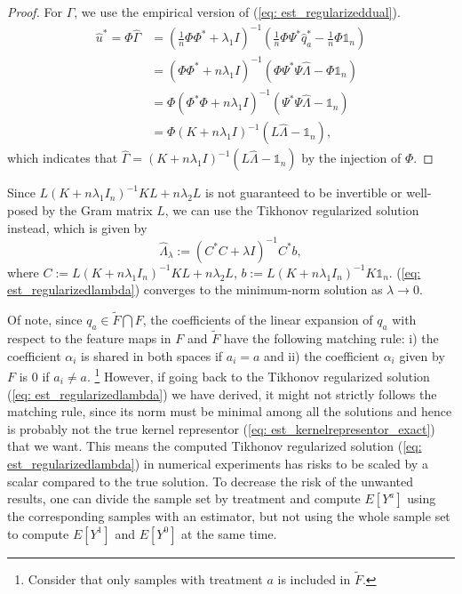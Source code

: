 \begin{proof}
    For $\widehat{\Gamma}$, we use the empirical version of (\ref{eq: est_regularizeddual}). 
    \begin{align*}
        \widehat{u}^* = \Phi\widehat{\Gamma} &= (\frac{1}{n}\Phi\Phi^*+\lambda_1I)^{-1}(\frac{1}{n}\Phi\Psi^*\widehat{q}_a^*-\frac{1}{n}\Phi\mathds{1}_n) \\
                                             &= (\Phi\Phi^*+n\lambda_1I)^{-1}(\Phi\Psi^*\Psi\widehat{\Lambda}-\Phi\mathds{1}_n) \\
                                             &= \Phi(\Phi^*\Phi+n\lambda_1I)^{-1}(\Psi^*\Psi\widehat{\Lambda}-\mathds{1}_n) \\
                                             &= \Phi(K+n\lambda_1I)^{-1}(L\widehat{\Lambda}-\mathds{1}_n),
    \end{align*}
    which indicates that $\widehat{\Gamma}=(K+n\lambda_1I)^{-1}(L\widehat{\Lambda}-\mathds{1}_n)$ by the injection of $\Phi$.
\end{proof}

Since $L(K+n\lambda_1I_n)^{-1}KL+n\lambda_2L$ is not guaranteed to be invertible or well-posed by the Gram matrix $L$, 
we can use the Tikhonov regularized solution instead, which is given by 
\begin{equation}
    \label{eq: est_regularizedlambda}
    \widehat{\Lambda}_{\lambda} := (C^*C+\lambda I)^{-1}C^*b,
\end{equation}
where $C:=L(K+n\lambda_1I_n)^{-1}KL+n\lambda_2L$, $b:=L(K+n\lambda_1I_n)^{-1}K\mathds{1}_n$. 
(\ref{eq: est_regularizedlambda}) converges to the minimum-norm solution as $\lambda\rightarrow 0$. 

\begin{remark}
    \label{rem: est_dilemmaofestimator}
    Of note, since $q_a\in\tilde{F}\bigcap F$, the coefficients of the linear expansion of $q_a$ with respect to the feature maps 
    in $F$ and $\tilde{F}$ have the following matching rule: i) the coefficient $\alpha_i$ is shared in both spaces if $a_i=a$ and 
    ii) the coefficient $\alpha_i$ given by $F$ is 0 if $a_i\neq a$. \footnote{Consider that only samples with treatment $a$ is included in $\tilde{F}$.}
    However, if going back to the Tikhonov regularized solution (\ref{eq: est_regularizedlambda}) we have derived, 
    it might not strictly follows the matching rule, 
    since its norm must be minimal among all the solutions and hence is probably not the true kernel representor (\ref{eq: est_kernelrepresentor_exact}) that we want.
    This means the computed Tikhonov regularized solution (\ref{eq: est_regularizedlambda}) in numerical experiments has risks to be scaled by a scalar compared to the true solution. 
    To decrease the risk of the unwanted results, 
    one can divide the sample set by treatment and compute $E[Y^a]$ using the corresponding samples with an estimator, 
    but not using the whole sample set to compute $E[Y^1]$ and $E[Y^0]$ at the same time. 
\end{remark}


